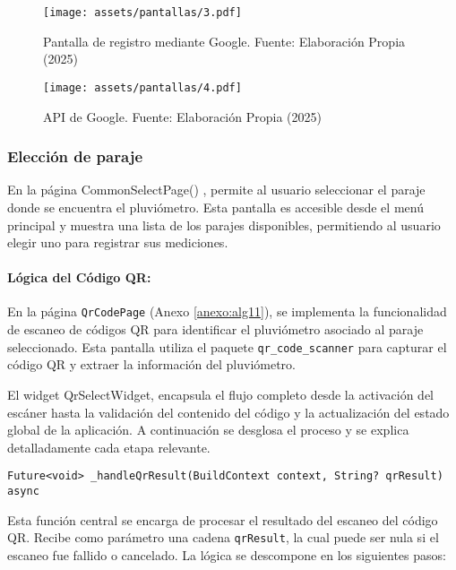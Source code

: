 \begin{figure}[h!]
\centering
  \texttt{[image: assets/pantallas/3.pdf]}
  \caption{Pantalla de registro mediante Google. Fuente: Elaboración Propia (2025)}
  \label{pantallas2}
\end{figure}

\begin{figure}[h!]
\centering
  \texttt{[image: assets/pantallas/4.pdf]}
  \caption{API de Google. Fuente: Elaboración Propia (2025)}
  \label{pantallas4}
\end{figure}


\newpage
\subsubsection*{Elección de paraje}


En la página CommonSelectPage() %
, permite al usuario seleccionar el paraje donde se encuentra el pluviómetro. Esta pantalla es accesible desde el menú principal y muestra una lista de los parajes disponibles, permitiendo al usuario elegir uno para registrar sus mediciones.


\paragraph{Lógica del Código QR:}

En la página \texttt{QrCodePage} (Anexo \ref{anexo:alg11}), se implementa la funcionalidad de escaneo de códigos QR para identificar el pluviómetro asociado al paraje seleccionado. Esta pantalla utiliza el paquete \texttt{qr\_code\_scanner} para capturar el código QR y extraer la información del pluviómetro.



El widget QrSelectWidget, encapsula el flujo completo desde la activación del escáner hasta la validación del contenido del código y la actualización del estado global de la aplicación. A continuación se desglosa el proceso y se explica detalladamente cada etapa relevante.

\begin{verbatim}
Future<void> _handleQrResult(BuildContext context, String? qrResult) async
\end{verbatim}

Esta función central se encarga de procesar el resultado del escaneo del código QR. Recibe como parámetro una cadena \texttt{qrResult}, la cual puede ser nula si el escaneo fue fallido o cancelado. La lógica se descompone en los siguientes pasos:

